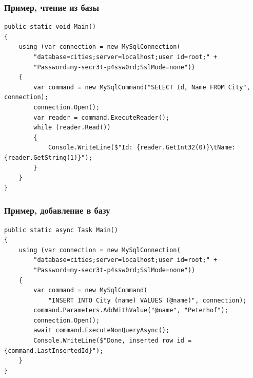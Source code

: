 \documentclass[xetex,mathserif,serif]{beamer}
\begin{document}
	\begin{frame}[fragile]
		\frametitle{Пример, чтение из базы}
		\begin{footnotesize}
			\begin{verbatim}
public static void Main()
{
    using (var connection = new MySqlConnection(
        "database=cities;server=localhost;user id=root;" + 
        "Password=my-secr3t-p4ssw0rd;SslMode=none"))
    {
        var command = new MySqlCommand("SELECT Id, Name FROM City", connection);
        connection.Open();
        var reader = command.ExecuteReader();
        while (reader.Read())
        {
            Console.WriteLine($"Id: {reader.GetInt32(0)}\tName:{reader.GetString(1)}");
        }
    }
}
			\end{verbatim}
		\end{footnotesize}
	\end{frame}

	\begin{frame}[fragile]
		\frametitle{Пример, добавление в базу}
		\begin{footnotesize}
			\begin{verbatim}
public static async Task Main()
{
    using (var connection = new MySqlConnection(
        "database=cities;server=localhost;user id=root;" +
        "Password=my-secr3t-p4ssw0rd;SslMode=none"))
    {
        var command = new MySqlCommand(
            "INSERT INTO City (name) VALUES (@name)", connection);
        command.Parameters.AddWithValue("@name", "Peterhof");
        connection.Open();
        await command.ExecuteNonQueryAsync();
        Console.WriteLine($"Done, inserted row id = {command.LastInsertedId}");
    }
}
			\end{verbatim}
		\end{footnotesize}
	\end{frame}
\end{document}
